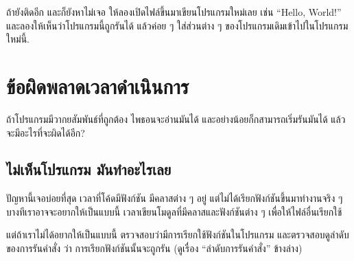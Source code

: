 ถ้ายังติดอีก และก็ยังหาไม่เจอ ให้ลองเปิดไฟล์ขึ้นมาเขียนโปรแกรมใหม่เลย เช่น ``Hello, World!'' และลองให้เห็นว่าโปรแกรมนี้ถูกรันได้
แล้วค่อย ๆ ใส่ส่วนต่าง ๆ ของโปรแกรมเดิมเข้าไปในโปรแกรมใหม่นี้.

\section{ข้อผิดพลาดเวลาดำเนินการ}


ถ้าโปรแกรมมีวากยสัมพันธ์ที่ถูกต้อง
ไพธอนจะอ่านมันได้ และอย่างน้อยก็กสามารถเริ่มรันมันได้
แล้วจะมีอะไรที่จะผิดได้อีก?

\subsection{ไม่เห็นโปรแกรม มันทำอะไรเลย}


ปัญหานี้เจอบ่อยที่สุด เวลาที่โค้ดมีฟังก์ชัน มีคลาสต่าง ๆ อยู่
แต่ไม่ได้เรียกฟังก์ชันขึ้นมาทำงานจริง ๆ
บางทีเราอาจจะอยากให้เป็นแบบนี้ เวลาเขียนโมดูลที่มีคลาสและฟังก์ชันต่าง ๆ เพื่อให้ไฟล์อื่นเรียกใช้


แต่ถ้าเราไม่ได้อยากให้เป็นแบบนี้
ตรวจสอบว่ามีการเรียกใช้ฟังก์ชันในโปรแกรม
และตรวจสอบดูลำดับของการรันคำสั่ง ว่า การเรียกฟังก์ชันนั้นจะถูกรัน 
(ดูเรื่อง ``ลำดับการรันคำสั่ง'' ข้างล่าง)


